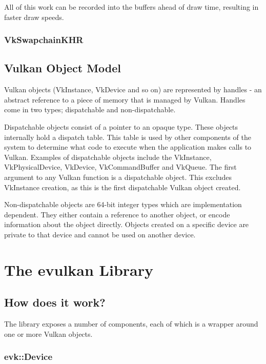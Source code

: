 \documentclass[12pt]{report}
\theoremstyle{definition}
\begin{document}
        All of this work can be recorded into the buffers ahead of draw time,
        resulting in faster draw speeds.

      \subsection{VkSwapchainKHR}


    \section{Vulkan Object Model}

      Vulkan objects (VkInstance, VkDevice and so on) are represented by
      handles - an abstract reference to a piece of memory that is managed by
      Vulkan. Handles come in two types; dispatchable and non-dispatchable.

      Dispatchable objects consist of a pointer to an opaque type. These
      objects internally hold a dispatch table. This table is used by other
      components of the system to determine what code to execute when the
      application makes calls to Vulkan. Examples of dispatchable objects
      include the VkInstance, VkPhysicalDevice, VkDevice, VkCommandBuffer
      and VkQueue. The first argument to any Vulkan function is a
      dispatchable object. This excludes VkInstance creation, as this
      is the first dispatchable Vulkan object created.

      Non-dispatchable objects are 64-bit integer types which are
      implementation dependent. They either contain a reference to another
      object, or encode information about the object directly. Objects
      created on a specific device are private to that device and cannot
      be used on another device.

  \chapter{The evulkan Library}

    \section{How does it work?}

      The library exposes a number of components, each of which is a wrapper
      around one or more Vulkan objects.

      \subsection{evk::Device}
\end{document}

